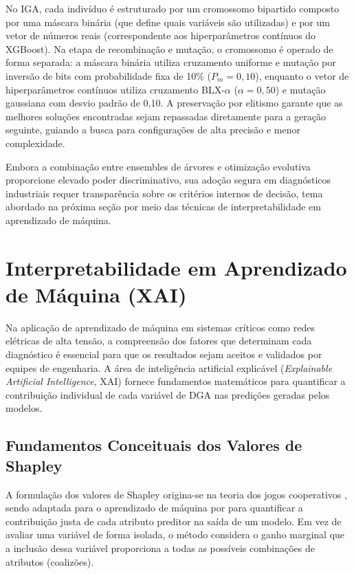 No IGA, cada indivíduo é estruturado por um cromossomo bipartido composto por uma máscara binária (que define quais variáveis são utilizadas) e por um vetor de números reais (correspondente aos hiperparâmetros contínuos do XGBoost). Na etapa de recombinação e mutação, o cromossomo é operado de forma separada: a máscara binária utiliza cruzamento uniforme e mutação por inversão de bits com probabilidade fixa de 10\% ($P_m = 0,10$), enquanto o vetor de hiperparâmetros contínuos utiliza cruzamento BLX-$\alpha$ ($\alpha = 0,50$) e mutação gaussiana com desvio padrão de 0,10. A preservação por elitismo garante que as melhores soluções encontradas sejam repassadas diretamente para a geração seguinte, guiando a busca para configurações de alta precisão e menor complexidade.

Embora a combinação entre ensembles de árvores e otimização evolutiva proporcione elevado poder discriminativo, sua adoção segura em diagnósticos industriais requer transparência sobre os critérios internos de decisão, tema abordado na próxima seção por meio das técnicas de interpretabilidade em aprendizado de máquina.

\section{Interpretabilidade em Aprendizado de Máquina (XAI)}\label{sec:xai_shap}

Na aplicação de aprendizado de máquina em sistemas críticos como redes elétricas de alta tensão, a compreensão dos fatores que determinam cada diagnóstico é essencial para que os resultados sejam aceitos e validados por equipes de engenharia. A área de inteligência artificial explicável (\textit{Explainable Artificial Intelligence}, XAI) fornece fundamentos matemáticos para quantificar a contribuição individual de cada variável de DGA nas predições geradas pelos modelos.

\subsection{Fundamentos Conceituais dos Valores de Shapley}\label{sec:valores_shapley}

A formulação dos valores de Shapley origina-se na teoria dos jogos cooperativos \cite{shapley1953}, sendo adaptada para o aprendizado de máquina por  para quantificar a contribuição justa de cada atributo preditor na saída de um modelo. Em vez de avaliar uma variável de forma isolada, o método considera o ganho marginal que a inclusão dessa variável proporciona a todas as possíveis combinações de atributos (coalizões).

